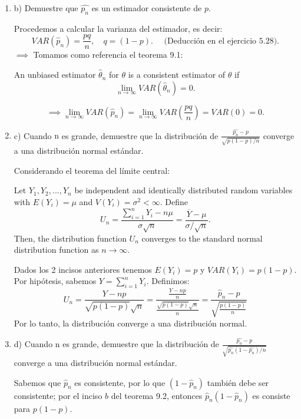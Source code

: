 \begin{enumerate}
\begin{solution}
	\end{solution}
	\item b) Demuestre que $\widehat{p_{n}}$ es un estimador consistente de $p$.
	\begin{solution} 
		Procedemos a calcular la varianza del estimador, es decir: 
		$$VAR(\hat{p}_n)=\frac{pq}{n},\quad q=(1-p). \quad \text{ (Deducción en el ejercicio 5.28).}$$
		$\implies$ Tomamos como referencia el teorema 9.1:
		\begin{tcolorbox}[colback=gray!15,colframe=black!1!black,title=Teorema 9.1]
			An unbiased estimator $\hat{\theta}_n$ for $\theta$ is a consistent estimator of $\theta$ if
			$$\lim_{n\to\infty}VAR(\hat{\theta}_n)=0.$$
		\end{tcolorbox}
	$$\implies \lim_{n\to\infty}VAR(\hat{p}_n)=\lim_{n\to\infty}VAR\left(\frac{pq}{n}\right)=VAR\left(0\right)=0.$$
	\end{solution}
	\item c) Cuando $\mathrm{n}$ es grande, demuestre que la distribución de $\frac{\widehat{p_{n}}-p}{\sqrt{p(1-p) / n}}$ converge a una distribución normal estándar.
	\begin{solution}
		Considerando el teorema del límite central:
		\begin{tcolorbox}[colback=gray!15,colframe=black!1!black,title=Teorema 7.4]
			Let $Y_1, Y_2, . . . , Y_n$ be independent and identically distributed random variables with $E (Y_i ) = \mu$ and $V (Y_i ) = \sigma^ 2 < \infty$. Define
			$$U_n=\frac{\sum_{i=1}^{n}Y_i-n\mu }{\sigma\sqrt{n}}=\frac{\overline{Y}-\mu}{\sigma/\sqrt{n}}.$$
			Then, the distribution function $U_n$ converges to the standard normal distribution function as $n\to\infty$. 
		\end{tcolorbox}
	Dados los 2 incisos anteriores tenemos $E(Y_i)=p$ y $VAR(Y_i)=p(1-p)$. Por hipótesis, sabemos $Y=\sum_{i=1}^{n}Y_i$. Definimos: 
	$$U_n=\frac{Y-np}{\sqrt{p(1-p)}\sqrt{n}}=\frac{\frac{Y-np}{n}}{\frac{\sqrt{p(1-p)}\sqrt{n}}{n}}=\frac{\hat{p}_n-p}{\sqrt{\frac{p(1-p)}{n}}}$$
	Por lo tanto, la distribución converge a una distribución normal.
	\end{solution}
	\item d) Cuando $\mathrm{n}$ es grande, demuestre que la distribución de $\frac{\widehat{p_{n}}-p}{\sqrt{\widehat{p_{n}}\left(1-\widehat{p_{n}}\right) / n}}$ converge a una distribución normal estándar. 
	\begin{solution}
	Sabemos que $\hat{p}_n$ es consistente, por lo que $(1-\hat{p}_n)$ también debe ser consistente; por el inciso $b$ del teorema 9.2, entonces $\hat{p}_n(1-\hat{p}_n)$ es consiste para $p(1-p)$. 

\end{solution}
\end{enumerate}
